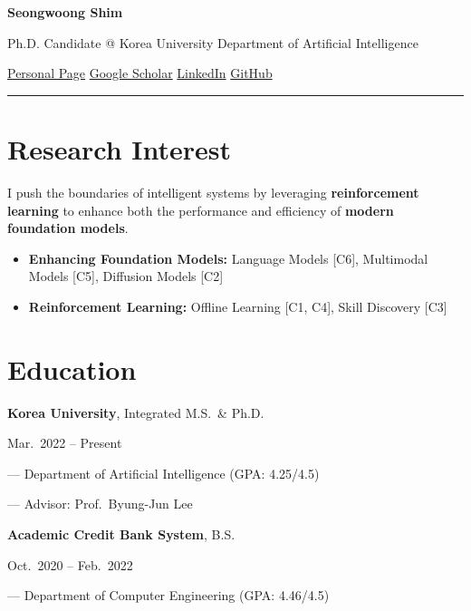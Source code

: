 \documentclass[10.5pt,a4paper]{article}
\makeatletter
\newif\ifhasfa
\newcommand{\ic}[1]{\ifhasfa\csname fa#1\endcsname\hspace{0.35em}\fi}
\newcommand{\CVNAME}{Seongwoong Shim}
\newcommand{\CVEMAIL}{ssw030830@korea.ac.kr}
\newcommand{\CVSITE}{https://seongwoongshim.github.io}
\newcommand{\CVGITHUB}{https://github.com/tlatjddnd101}
\newcommand{\CVSCHOLAR}{https://scholar.google.com/citations?user=gMlzJjYAAAAJ}
\newcommand{\CVLINKEDIN}{https://www.linkedin.com/in/seongwoong-shim-278221251/}
\newcommand{\entry}[2]{%
  \noindent
  \begin{minipage}[t]{0.765\textwidth}\raggedright\strut #1\strut\end{minipage}%
  \hfill
  \begin{minipage}[t]{0.215\textwidth}\raggedleft\strut{\small\sffamily\color{muted}#2}\strut\end{minipage}%
  \par\vspace{1pt}}
\newcommand{\subline}[1]{{\small\color{muted}--- #1}\par}
\makeatother
\begin{document}
{\sffamily\bfseries\fontsize{24}{27}\selectfont \CVNAME\par}
\vspace{4pt}
{\sffamily\small\color{muted}
 Ph.D. Candidate @ Korea University \textbar{} Department of Artificial Intelligence\par}
\vspace{5pt}
{\small\sffamily\color{muted}
 \href{mailto:\CVEMAIL}{\ic{Envelope}\CVEMAIL}\quad
 \href{\CVSITE}{\ic{Home}Personal Page}\quad
 \href{\CVSCHOLAR}{\ic{GraduationCap}Google Scholar}\quad
 \href{\CVLINKEDIN}{\ic{Linkedin}LinkedIn}\quad
 \href{\CVGITHUB}{\ic{Github}GitHub}\par}
\vspace{3pt}
{\color{rule}\rule{\textwidth}{0.6pt}}

\section*{Research Interest}
I push the boundaries of intelligent systems by leveraging \textbf{reinforcement learning}
to enhance both the performance and efficiency of \textbf{modern foundation models}.
\begin{itemize}
  \item \textbf{Enhancing Foundation Models:} Language Models [C6], Multimodal Models [C5], Diffusion Models [C2]
  \item \textbf{Reinforcement Learning:} Offline Learning [C1, C4], Skill Discovery [C3]
\end{itemize}

\section*{Education}

\entry{\textbf{Korea University}, Integrated M.S.\ \& Ph.D.}{Mar.\ 2022 -- Present}
\subline{Department of Artificial Intelligence (GPA: 4.25/4.5)}
\subline{Advisor: Prof.\ Byung-Jun Lee}
\vspace{11pt}

\entry{\textbf{Academic Credit Bank System}, B.S.}{Oct.\ 2020 -- Feb.\ 2022}
\subline{Department of Computer Engineering (GPA: 4.46/4.5)}

%
%
\end{document}
